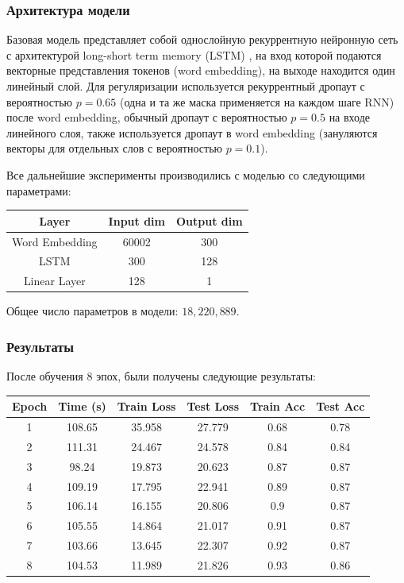 \documentclass[12pt]{article}
\begin{document}
\subsubsection*{Архитектура модели}
Базовая модель представляет собой однослойную рекуррентную нейронную сеть с архитектурой long-short term memory (LSTM) \cite{Hochreiter:1997:LSM:1246443.1246450}, на вход которой подаются векторные представления
токенов (word embedding), на выходе находится один линейный слой. Для регуляризации используется рекуррентный дропаут \cite{1512.05287} с вероятностью $p=0.65$ (одна и та же маска применяется на каждом шаге RNN) после word embedding,
обычный дропаут \cite{JMLR:v15:srivastava14a} с вероятностью $p=0.5$ на входе линейного слоя, также используется дропаут в word embedding \cite{1512.05287} (зануляются векторы для отдельных слов с вероятностью $p=0.1$).

Все дальнейшие эксперименты производились с моделью со следующими параметрами:
\begin{center}
  \begin{tabular}{ c  c  c }
    \hline
    Layer & Input dim & Output dim \\ \hline
    Word Embedding & 60002 & 300 \\
    LSTM & 300 & 128 \\
    Linear Layer & 128 & 1 \\ \hline
  \end{tabular}
\end{center}

Общее число параметров в модели: $18,220,889$.
\subsubsection*{Результаты}
После обучения $8$ эпох, были получены следующие результаты:

\begin{center}
\begin{tabular}{cccccc}
  \hline
  Epoch & Time (s) & Train Loss & Test Loss & Train Acc & Test Acc \\ \hline
  1 & 108.65 & 35.958 & 27.779 & 0.68 & 0.78 \\
  2 & 111.31 & 24.467 & 24.578 & 0.84 & 0.84 \\
  3 & 98.24 & 19.873 & 20.623 & 0.87 & 0.87 \\
  4 & 109.19 & 17.795 & 22.941 & 0.89 & 0.87 \\
  5 & 106.14 & 16.155 & 20.806 & 0.9 & 0.87 \\
  6 & 105.55 & 14.864 & 21.017 & 0.91 & 0.87 \\
  7 & 103.66 & 13.645 & 22.307 & 0.92 & 0.87 \\
  8 & 104.53 & 11.989 & 21.826 & 0.93 & 0.86 \\ \hline
\end{tabular}
\end{center}
\end{document}

